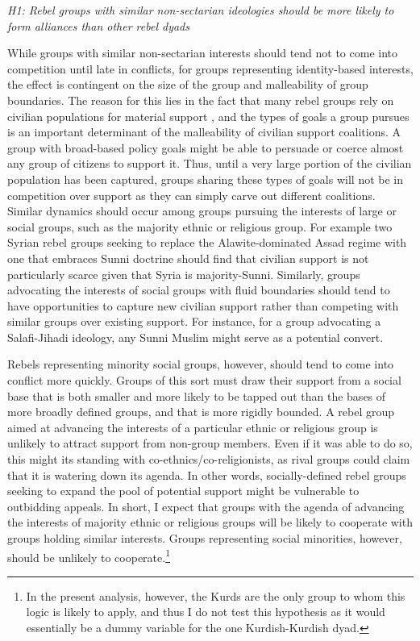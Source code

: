 \documentclass[12pt,]{book}
\let\rmarkdownfootnote\footnote%
\def\footnote{\protect\rmarkdownfootnote}
\begin{document}
\emph{H1: Rebel groups with similar non-sectarian ideologies should be
more likely to form alliances than other rebel dyads}

While groups with similar non-sectarian interests should tend not to
come into competition until late in conflicts, for groups representing
identity-based interests, the effect is contingent on the size of the
group and malleability of group boundaries. The reason for this lies in
the fact that many rebel groups rely on civilian populations for
material support \citep{Weinstein2007}, and the types of goals a group
pursues is an important determinant of the malleability of civilian
support coalitions. A group with broad-based policy goals might be able
to persuade or coerce almost any group of citizens to support it. Thus,
until a very large portion of the civilian population has been captured,
groups sharing these types of goals will not be in competition over
support as they can simply carve out different coalitions. Similar
dynamics should occur among groups pursuing the interests of large or
social groups, such as the majority ethnic or religious group. For
example two Syrian rebel groups seeking to replace the Alawite-dominated
Assad regime with one that embraces Sunni doctrine should find that
civilian support is not particularly scarce given that Syria is
majority-Sunni. Similarly, groups advocating the interests of social
groups with fluid boundaries should tend to have opportunities to
capture new civilian support rather than competing with similar groups
over existing support. For instance, for a group advocating a
Salafi-Jihadi ideology, any Sunni Muslim might serve as a potential
convert.

Rebels representing minority social groups, however, should tend to come
into conflict more quickly. Groups of this sort must draw their support
from a social base that is both smaller and more likely to be tapped out
than the bases of more broadly defined groups, and that is more rigidly
bounded. A rebel group aimed at advancing the interests of a particular
ethnic or religious group is unlikely to attract support from non-group
members. Even if it was able to do so, this might its standing with
co-ethnics/co-religionists, as rival groups could claim that it is
watering down its agenda. In other words, socially-defined rebel groups
seeking to expand the pool of potential support might be vulnerable to
outbidding appeals. In short, I expect that groups with the agenda of
advancing the interests of majority ethnic or religious groups will be
likely to cooperate with groups holding similar interests. Groups
representing social minorities, however, should be unlikely to
cooperate.\footnote{In the present analysis, however, the Kurds are the
  only group to whom this logic is likely to apply, and thus I do not
  test this hypothesis as it would essentially be a dummy variable for
  the one Kurdish-Kurdish dyad.}
\end{document}
